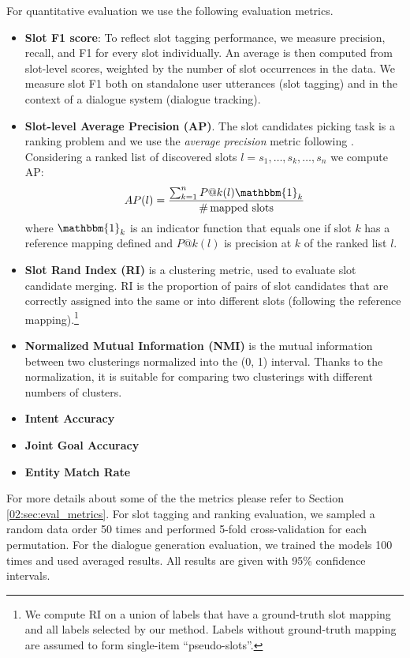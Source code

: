 For quantitative evaluation we use the following evaluation metrics.
\begin{itemize}[nosep,leftmargin=10pt]
    \item \textbf{Slot F1 score}: To reflect slot tagging performance, we measure precision, recall, and F1 for every slot individually.
    An average is then computed from slot-level scores, weighted by the number of slot occurrences in the data.
    We measure slot F1 both on standalone user utterances (slot tagging) and in the context of a dialogue system (dialogue tracking).
    \item \textbf{Slot-level Average Precision (AP)}. The slot candidates picking task is a ranking problem and we use the \textit{average precision} metric following \citet{chen2014leveraging}.
    Considering a ranked list of discovered slots $l = s_1, \dots, s_k, \dots, s_n$ we compute AP:
    \begin{equation}
        AP(l) = \frac{\sum_{k=1}^n P@k(l)\mathbbm{1}_k}{\mbox{\#\,mapped\ slots}}
    \end{equation}
    where $\mathbbm{1}_k$ is an indicator function that equals one if slot $k$ has a reference mapping defined and $P@k(l)$ is precision at $k$ of the ranked list $l$.
    \item \textbf{Slot Rand Index (RI)} is a clustering metric, used to evaluate slot candidate merging. RI is the proportion of pairs of slot candidates that are correctly assigned into the same or into different slots (following the reference mapping).\footnote{We compute RI on a union of labels that have a ground-truth slot mapping and all labels selected by our method. Labels without ground-truth mapping are assumed to form single-item “pseudo-slots”.}
    
    \item \textbf{Normalized Mutual Information (NMI)} is the mutual information between two clusterings normalized into the (0, 1) interval.
    Thanks to the normalization, it is suitable for comparing two clusterings with different numbers of clusters.
    \item \textbf{Intent Accuracy}
    \item \textbf{Joint Goal Accuracy}
    \item \textbf{Entity Match Rate}
\end{itemize}
For more details about some of the the metrics please refer to Section \ref{02:sec:eval_metrics}.
For slot tagging and ranking evaluation, we sampled a random data order 50 times and performed 5-fold cross-validation for each permutation.
For the dialogue generation evaluation, we trained the models 100 times and used averaged results.
All results are given with 95\% confidence intervals.

